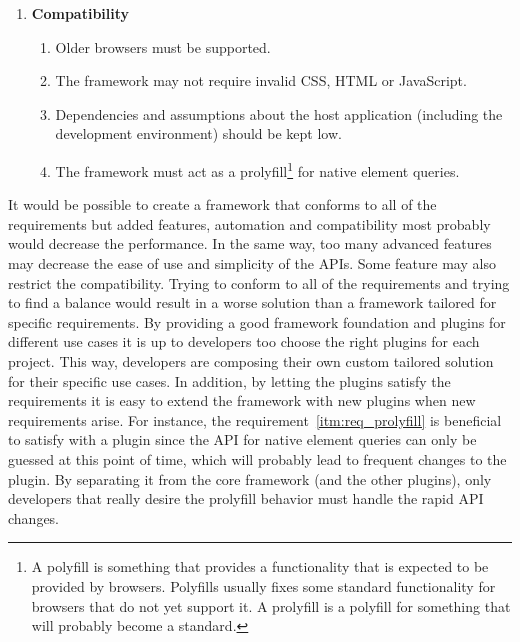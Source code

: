 \documentclass[a4paper,11pt]{kth-mag}
\begin{document}
\begin{enumerate}
          \item \textbf{Compatibility}
            \begin{enumerate}
              \item Older \glspl{browser} must be supported.
              \item The framework may not require invalid \gls{CSS}, \gls{HTML} or \gls{JavaScript}.
              \item\label{itm:assumption} Dependencies and assumptions about the host application (including the development environment) should be kept low.
              \item\label{itm:req_prolyfill} The framework must act as a prolyfill\footnote{A polyfill is something that provides a functionality that is expected to be provided  by \glspl{browser}. Polyfills usually fixes some standard functionality for \glspl{browser} that do not yet support it. A prolyfill is a polyfill for something that will probably become a standard.} for \gls{native} element queries.
            \end{enumerate}
        \end{enumerate}
        It would be possible to create a framework that conforms to all of the requirements but added features, automation and compatibility most probably would decrease the performance.
        In the same way, too many advanced features may decrease the ease of use and simplicity of the \glspl{API}.
        Some feature may also restrict the compatibility.
        Trying to conform to all of the requirements and trying to find a balance would result in a worse solution than a framework tailored for specific requirements.
        By providing a good framework foundation and plugins for different use cases it is up to developers too choose the right plugins for each project.
        This way, developers are composing their own custom tailored solution for their specific use cases.
        In addition, by letting the plugins satisfy the requirements it is easy to extend the framework with new plugins when new requirements arise.
        For instance, the requirement~\ref{itm:req_prolyfill} is beneficial to satisfy with a plugin since the \gls{API} for \gls{native} element queries can only be guessed at this point of time, which will probably lead to frequent changes to the plugin.
        By separating it from the core framework (and the other plugins), only developers that really desire the prolyfill behavior must handle the rapid \gls{API} changes.
\end{document}
